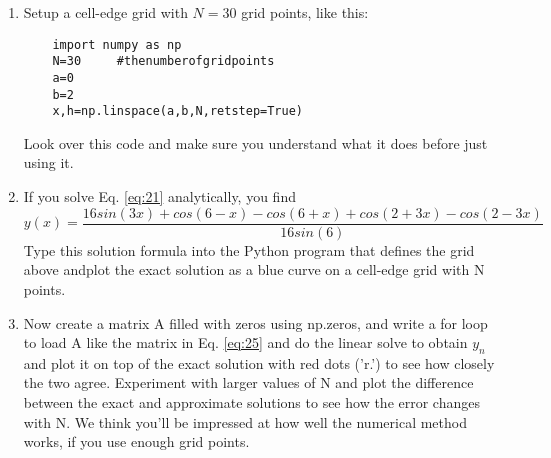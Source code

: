 \begin{problem} \label{P2.2}
\begin{enumerate}[label=(\alph*)]
	\item  Setup a cell-edge grid with $N=30$ grid points, like this: 
	\begin{lstlisting}	
	import numpy as np 
	N=30     #thenumberofgridpoints 
	a=0 
	b=2 
	x,h=np.linspace(a,b,N,retstep=True)
	\end{lstlisting}	
	 Look over this code and make sure you understand what it does before just using it.
	\item If you solve Eq. \eqref{eq:21} analytically, you find
	\begin{equation}
	y(x) = \frac{16sin(3x)+cos(6-x)-cos(6+x)+cos(2+3x)-cos(2-3x)}{16sin(6)}
\end{equation}		
		Type this solution formula into the Python program that defines the grid above andplot the exact solution as a blue curve on a cell-edge grid with N points.

		\item Now create a matrix A filled with zeros using np.zeros, and write a for loop to load A like the matrix in Eq. \eqref{eq:25} and do the linear solve to obtain $y_n$ and plot it on top of the exact solution with red dots ('r.') to see how closely the two agree. Experiment with larger values of N and plot the difference between the exact and approximate solutions to see how the error changes with N. We think you\rq ll be impressed at how well the numerical method works, if you use enough grid points.
\end{enumerate}
\end{problem}

